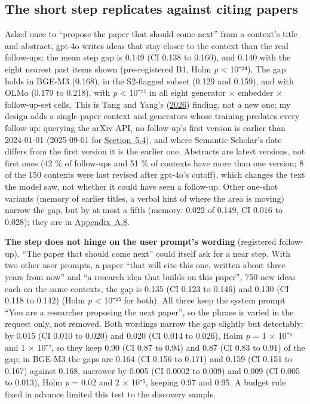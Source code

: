 \documentclass[
  10pt,
]{article}
\begin{document}
\subsection{The short step replicates against citing papers}\label{sec:5.1}

Asked once to ``propose the paper that
should come next'' from a context's
title and abstract, gpt-4o writes ideas
that stay closer to the context than the
real follow-ups: the mean step gap is
0.149 (CI 0.138 to 0.160), and 0.140
with the eight nearest past items shown
(pre-registered B1, Holm \emph{p}
\textless{} 10⁻²⁴). The gap holds in
BGE-M3 (0.168), in the S2-flagged subset
(0.129 and 0.159), and with OLMo (0.179
to 0.218), with \emph{p} \textless{}
10⁻¹¹ in all eight generator × embedder
× follow-up-set cells. This is Tang and
Yang's (\hyperlink{ref-Tang2026}{2026})
finding, not a new one; my design adds a
single-paper context and generators
whose training predates every follow-up:
querying the arXiv API, no follow-up's
first version is earlier than 2024-01-01
(2025-09-01 for
\hyperref[sec:5.4]{Section~5.4}), and
where Semantic Scholar's date differs
from the first version it is the earlier
one. Abstracts are latest versions, not
first ones (42 \% of follow-ups and 51
\% of contexts have more than one
version; 8 of the 150 contexts were last
revised after gpt-4o's cutoff), which
changes the text the model saw, not
whether it could have seen a follow-up.
Other one-shot variants (memory of
earlier titles, a verbal hint of where
the area is moving) narrow the gap, but
by at most a fifth (memory: 0.022 of
0.149, CI 0.016 to 0.028); they are in
\hyperref[app:A.8]{Appendix~A.8}.

\textbf{The step does not hinge on the
user prompt's wording} (registered
follow-up). ``The paper that should come
next'' could itself ask for a near step.
With two other user prompts, a paper
``that will cite this one, written about
three years from now'' and ``a research
idea that builds on this paper'', 750
new ideas each on the same contexts, the
gap is 0.135 (CI 0.123 to 0.146) and
0.130 (CI 0.118 to 0.142) (Holm \emph{p}
\textless{} 10⁻²⁵ for both). All three
keep the system prompt ``You are a
researcher proposing the next paper'',
so the phrase is varied in the request
only, not removed. Both wordings narrow
the gap slightly but detectably: by
0.015 (CI 0.010 to 0.020) and 0.020 (CI
0.014 to 0.026), Holm \emph{p} = 1 ×
10⁻⁶ and 1 × 10⁻⁷, so they keep 0.90 (CI
0.87 to 0.94) and 0.87 (CI 0.83 to 0.91)
of the gap; in BGE-M3 the gaps are 0.164
(CI 0.156 to 0.171) and 0.159 (CI 0.151
to 0.167) against 0.168, narrower by
0.005 (CI 0.0002 to 0.009) and 0.009 (CI
0.005 to 0.013), Holm \emph{p} = 0.02
and 2 × 10⁻⁵, keeping 0.97 and 0.95. A
budget rule fixed in advance limited
this test to the discovery sample.
\end{document}
